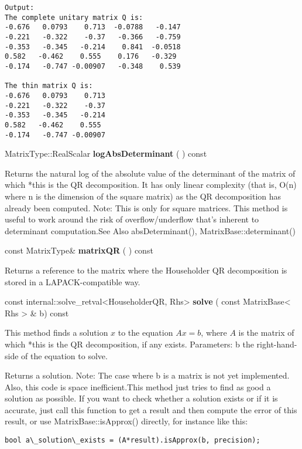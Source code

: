 \begin{verbatim}
Output:
The complete unitary matrix Q is:
-0.676   0.0793    0.713  -0.0788   -0.147
-0.221   -0.322    -0.37   -0.366   -0.759
-0.353   -0.345   -0.214    0.841  -0.0518
0.582   -0.462    0.555    0.176   -0.329
-0.174   -0.747 -0.00907   -0.348    0.539

The thin matrix Q is:
-0.676   0.0793    0.713
-0.221   -0.322    -0.37
-0.353   -0.345   -0.214
0.582   -0.462    0.555
-0.174   -0.747 -0.00907
\end{verbatim}


\vspace{0.3cm}
MatrixType::RealScalar \textbf{logAbsDeterminant}  ( )  const 

Returns the natural log of the absolute value of the determinant of the matrix of which *this is the QR decomposition. It has only linear complexity (that is, O(n) where n is the dimension of the square matrix) as the QR decomposition has already been computed.
Note: This is only for square matrices.
This method is useful to work around the risk of overflow/underflow that's inherent to determinant computation.See Also
absDeterminant(), MatrixBase::determinant() 


\vspace{0.3cm}
const MatrixType\& \textbf{matrixQR}  ( )  const 

Returns a reference to the matrix where the Householder QR decomposition is stored in a LAPACK-compatible way. 


const internal::solve\_retval<HouseholderQR, Rhs> \textbf{solve}  ( const MatrixBase< Rhs > \&  b)  const 

This method finds a solution $x$ to the equation $Ax=b$, where $A$ is the matrix of which *this is the QR decomposition, if any exists.
Parameters: b the right-hand-side of the equation to solve. 

Returns a solution.
Note: The case where b is a matrix is not yet implemented. Also, this code is space inefficient.This method just tries to find as good a solution as possible. If you want to check whether a solution exists or if it is accurate, just call this function to get a result and then compute the error of this result, or use MatrixBase::isApprox() directly, for instance like this:

\begin{verbatim}
bool a\_solution\_exists = (A*result).isApprox(b, precision); 
\end{verbatim}

